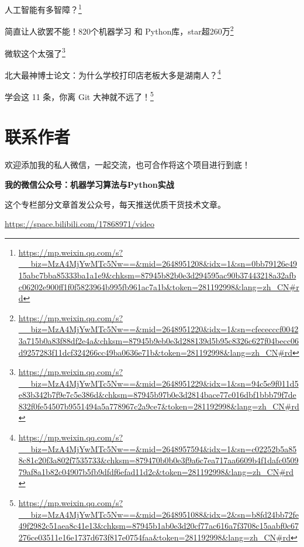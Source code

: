 \documentclass[]{ctexbook}
\renewcommand{\href}[2]{#2\footnote{\url{#1}}}
\begin{document}
\href{https://mp.weixin.qq.com/s?__biz=MzA4MjYwMTc5Nw==\&mid=2648951208\&idx=1\&sn=0bb79126e4915abc7bba85333ba1a1e9\&chksm=87945b82b0e3d294595ac90b37443218a32afbc06202e900ff1f0f5823964b995fb961ac7a1b\&token=281192998\&lang=zh_CN\#rd}{人工智能有多智障？}

\href{https://mp.weixin.qq.com/s?__biz=MzA4MjYwMTc5Nw==\&mid=2648951220\&idx=1\&sn=cfececccf00423a715b0a83f88df2e4a\&chksm=87945b9eb0e3d288139d5b95c8326c627f04becc06d9257283f11dcf324266cc49ba0636e71b\&token=281192998\&lang=zh_CN\#rd}{简直让人欲罢不能！820个机器学习 和 Python库，star超260万}

\href{https://mp.weixin.qq.com/s?__biz=MzA4MjYwMTc5Nw==\&mid=2648951229\&idx=1\&sn=94c5e9f011d5e83b342b7f9e7c5e386d\&chksm=87945b97b0e3d2814bace77c016dbf1bbb79f7de832f0fe54507b9551494a5a778967c2a9ce7\&token=281192998\&lang=zh_CN\#rd}{微软这个太强了}

\href{https://mp.weixin.qq.com/s?__biz=MzA4MjYwMTc5Nw==\&mid=2648957594\&idx=1\&sn=c02252b5a858c81c20f3a802f7535733\&chksm=879470b0b0e3f9a6c7ea717aa6609b4f1dafc050979af8a1b82c04907b5fb9dfdf6efad11d2c\&token=281192998\&lang=zh_CN\#rd}{北大最神博士论文：为什么学校打印店老板大多是湖南人？}

\href{https://mp.weixin.qq.com/s?__biz=MzA4MjYwMTc5Nw==\&mid=2648951088\&idx=2\&sn=b8fd24bb72fe49f2982c51aea8c41e13\&chksm=87945b1ab0e3d20cf77ac616a7f3708c15aabf0c67276ce03511e16e1737d673f817e0754faa\&token=281192998\&lang=zh_CN\#rd}{学会这 11 条，你离 Git 大神就不远了！}

\hypertarget{ux8054ux7cfbux4f5cux8005}{%
\chapter{联系作者}\label{ux8054ux7cfbux4f5cux8005}}

欢迎添加我的私人微信，一起交流，也可合作将这个项目进行到底！

\textbf{我的微信公众号：机器学习算法与Python实战}

这个专栏部分文章首发公众号，每天推送优质干货技术文章。

\url{https://space.bilibili.com/17868971/video}



\backmatter
\printindex
\end{document}
